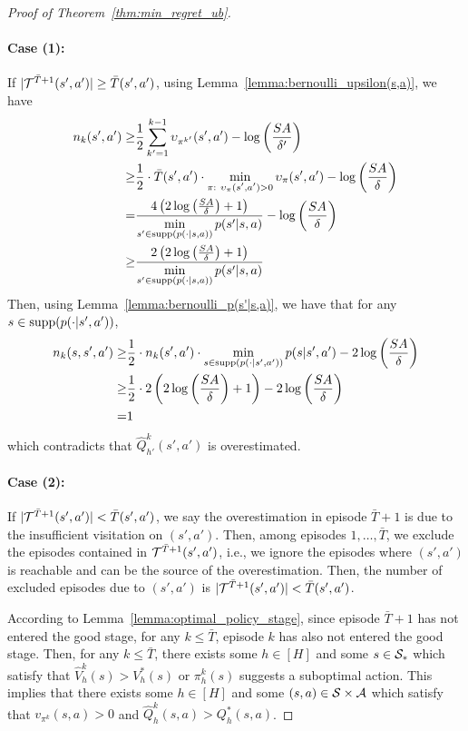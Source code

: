 \begin{proof}[Proof of Theorem~\ref{thm:min_regret_ub}]
	\paragraph{Case (1):} If $|\mathcal{T}^{\bar{T}+1}(s',a')| \geq \bar{T}(s',a')$, using Lemma~\ref{lemma:bernoulli_upsilon(s,a)}, we have 
	\begin{align*}
		n_k(s',a') \geq & \frac{1}{2} \sum_{k'=1}^{k-1} \upsilon_{\pi^{k'}}(s',a') - \log \left( \frac{SA}{\delta'} \right)
		\\
		\geq & \frac{1}{2} \cdot \bar{T}(s',a') \cdot \min \limits_{\begin{subarray}{c} \pi:\  \upsilon_{\pi}(s',a')>0 \end{subarray}} \upsilon_{\pi}(s',a')
		-  \log\left(  \frac{SA}{\delta}  \right)
		\\
		= & \frac{ 4 \left( 2\log\left(  \frac{SA}{\delta}  \right)+1 \right) }{\min \limits_{s' \in \textup{supp}( p(\cdot|s,a))} p(s'|s,a) } -  \log\left(  \frac{SA}{\delta}  \right)
		\\
		\geq & \frac{ 2 \left( 2\log\left(  \frac{SA}{\delta}  \right)+1 \right) }{\min \limits_{s' \in \textup{supp}( p(\cdot|s,a))} p(s'|s,a) }
	\end{align*}
	Then, using Lemma~\ref{lemma:bernoulli_p(s'|s,a)}, we have that for any $s \in \textup{supp}(p(\cdot|s',a'))$,
	\begin{align*}
		n_k(s,s',a') \geq & \frac{1}{2} \cdot n_k(s',a') \cdot \min \limits_{s \in \textup{supp}( p(\cdot|s',a'))} p(s|s',a') - 2 \log\left(  \frac{SA}{\delta}  \right)
		\\
		\geq & \frac{1}{2} \cdot 2 \left( 2\log\left(  \frac{SA}{\delta}  \right)+1 \right) - 2 \log\left(  \frac{SA}{\delta}  \right)
		\\
		= & 1
	\end{align*}
	which contradicts that $\hat{Q}^{k}_{h'}(s',a')$ is overestimated.
	
	\paragraph{Case (2):} If $|\mathcal{T}^{\bar{T}+1}(s',a')| < \bar{T}(s',a')$, we say the overestimation in episode $\bar{T}+1$ is due to the insufficient visitation on $(s',a')$. 
	Then, among episodes $1,\dots,\bar{T}$, we exclude the episodes contained in $\mathcal{T}^{\bar{T}+1}(s',a')$,  i.e., we ignore the episodes where $(s',a')$ is reachable and can be the source of the overestimation. Then, the number of excluded episodes due to $(s',a')$ is $|\mathcal{T}^{\bar{T}+1}(s',a')| < \bar{T}(s',a')$.
	
	According to Lemma~\ref{lemma:optimal_policy_stage}, since episode $\bar{T}+1$ has not entered the good stage, for any $k \leq \bar{T}$, episode $k$ has also not entered the good stage. Then, for any $k \leq \bar{T}$, there exists some $h \in [H]$ and some $s \in \mathcal{S}_*$ which satisfy that $\hat{V}^{k}_h(s) > V^{*}_h(s)$ or $\pi^{k}_h(s)$ suggests a suboptimal action. This implies that there exists some $h \in [H]$ and some $(s,a) \in \mathcal{S} \times \mathcal{A}$ which satisfy that $v_{\pi^{k}}(s,a)>0$ and $\hat{Q}^{k}_h(s,a)>Q^{*}_h(s,a)$.
	

\end{proof}
